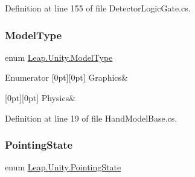 Definition at line 155 of file Detector\+Logic\+Gate.\+cs.

\mbox{\label{namespace_leap_1_1_unity_a186e5eb0a2b743f1f6b79346f0ab8ad0}} 
\subsubsection{\texorpdfstring{ModelType}{ModelType}}
{\footnotesize\ttfamily enum \mbox{\hyperlink{namespace_leap_1_1_unity_a186e5eb0a2b743f1f6b79346f0ab8ad0}{Leap.\+Unity.\+Model\+Type}}\hspace{0.3cm}{\ttfamily [strong]}}

\begin{DoxyEnumFields}{Enumerator}
[0pt][0pt]{}\mbox{\label{namespace_leap_1_1_unity_a186e5eb0a2b743f1f6b79346f0ab8ad0ad334dfcea59127bedfcdbe0a3ee7f494}} 
Graphics&\\
\hline

[0pt][0pt]{}\mbox{\label{namespace_leap_1_1_unity_a186e5eb0a2b743f1f6b79346f0ab8ad0a50ae99e9c35446c2580e4b540b0fd104}} 
Physics&\\
\hline

\end{DoxyEnumFields}


Definition at line 19 of file Hand\+Model\+Base.\+cs.

\mbox{\label{namespace_leap_1_1_unity_a1d316bf483102971171646a20de176fc}} 
\subsubsection{\texorpdfstring{PointingState}{PointingState}}
{\footnotesize\ttfamily enum \mbox{\hyperlink{namespace_leap_1_1_unity_a1d316bf483102971171646a20de176fc}{Leap.\+Unity.\+Pointing\+State}}\hspace{0.3cm}{\ttfamily [strong]}}

